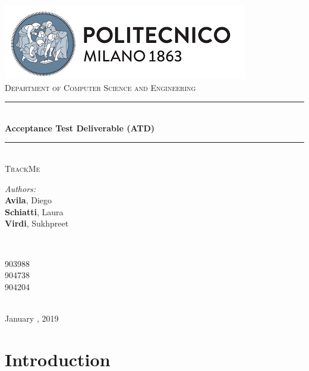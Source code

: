 \documentclass[a4paper, hidelinks, 12pt]{report}
\begin{document}
	\begin{titlepage}
		\centering
		\vspace*{0.7 cm}
		\includegraphics[scale = 0.85]{../Assets/PolimiLogo.png}\\[1.6 cm]
		\textsc{\large Department of Computer Science and Engineering}\\[1.8 cm]

		\rule{\linewidth}{0.2 mm} \\[0.4 cm]
		{ \huge \bfseries Acceptance Test Deliverable (ATD)}\\
		\rule{\linewidth}{0.2 mm} \\[1.5 cm]

		\textsc{\Large TrackMe}\\[3 cm]

		\begin{minipage}{0.4\textwidth}
			\begin{flushleft} \large
				\emph{Authors:}\\
				\textbf{Avila}, Diego \\
				\textbf{Schiatti}, Laura \\
				\textbf{Virdi}, Sukhpreet
			\end{flushleft}
		\end{minipage}~
		\begin{minipage}{0.4\textwidth}
			\begin{flushright} \large
				903988 \\
				904738 \\
				904204
			\end{flushright}
		\end{minipage}\\[2 cm]


		{\large January  , 2019}\\[2 cm]

		\vfill
	\end{titlepage}

	\tableofcontents
	\newpage
	\listoffigures
	\clearpage
	\setcounter{page}{1}

	\chapter{Introduction}
\end{document}
